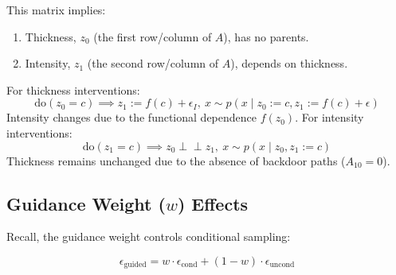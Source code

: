 \documentclass{article}
\newcommand{\indep}{\perp\!\!\!\!\perp}
\begin{document}
	This matrix implies: \begin{enumerate}
		\item Thickness, $z_0$ (the first row/column of $A$), has no parents.
		\item Intensity, $z_1$ (the second row/column of $A$), depends on thickness.
	\end{enumerate}
	
	For thickness interventions:
	$$\text{do}(z_0 = c) \implies  z_1 := f(c) + \epsilon_I, \ x \sim p(x \mid z_0 := c, z_1 := f(c)+\epsilon) $$
	Intensity changes due to the functional dependence $f(z_0)$. For intensity interventions:
	$$ \text{do}(z_1 = c) \implies z_0 \indep z_1, \ x \sim p(x \mid z_0, z_1 := c) $$
	Thickness remains unchanged due to the absence of backdoor paths ($A_{10} = 0$).
	
	\subsection*{Guidance Weight ($w$) Effects}
	Recall, the guidance weight controls conditional sampling:
	
	$$\epsilon_{\text{guided}} = w \cdot \epsilon_{\text{cond}} + (1 - w) \cdot \epsilon_{\text{uncond}}$$
	
\end{document}
